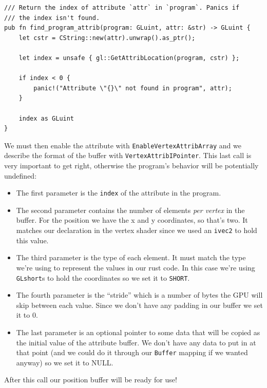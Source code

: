 \documentclass[a4paper]{article}
\newcommand{\code}[1] {\texttt{#1}}
\begin{document}
\begin{lstlisting}
/// Return the index of attribute `attr` in `program`. Panics if
/// the index isn't found.
pub fn find_program_attrib(program: GLuint, attr: &str) -> GLuint {
    let cstr = CString::new(attr).unwrap().as_ptr();

    let index = unsafe { gl::GetAttribLocation(program, cstr) };

    if index < 0 {
        panic!("Attribute \"{}\" not found in program", attr);
    }

    index as GLuint
}
\end{lstlisting}

We must then enable the attribute with \code{EnableVertexAttribArray}
and we describe the format of the buffer with
\code{VertexAttribIPointer}. This last call is very important to get
right, otherwise the program's behavior will be potentially undefined:

\begin{itemize}
\item The first parameter is the \code{index} of the attribute in the
  program.

\item The second parameter contains the number of elements \emph{per
  vertex} in the buffer. For the position we have the x and y
  coordinates, so that's two. It matches our declaration in the vertex
  shader since we used an \code{ivec2} to hold this value.

\item The third parameter is the type of each element. It must match
  the type we're using to represent the values in our rust code. In
  this case we're using \code{GLshort}s to hold the coordinates so we
  set it to \code{SHORT}.

\item The fourth parameter is the ``stride'' which is a number of
  bytes the GPU will skip between each value. Since we don't have any
  padding in our buffer we set it to 0.

\item The last parameter is an optional pointer to some data that will
  be copied as the initial value of the attribute buffer. We don't
  have any data to put in at that point (and we could do it through
  our \code{Buffer} mapping if we wanted anyway) so we set it to
  NULL.
\end{itemize}

After this call our position buffer will be ready for use!
\end{document}

